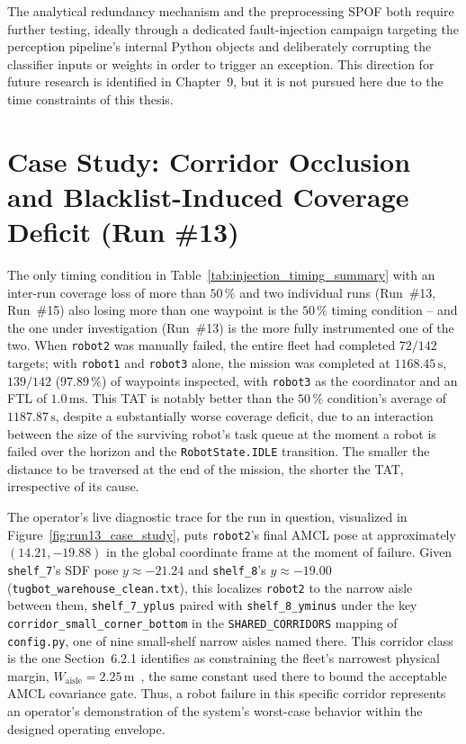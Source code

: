 The analytical redundancy mechanism and the preprocessing SPOF both require further testing, ideally through a dedicated fault-injection campaign targeting the perception pipeline's internal Python objects and deliberately corrupting the classifier inputs or weights in order to trigger an exception. This direction for future research is identified in Chapter~9, but it is not pursued here due to the time constraints of this thesis.

\section{Case Study: Corridor Occlusion and Blacklist-Induced Coverage Deficit (Run \#13)}

The only timing condition in Table~\ref{tab:injection_timing_summary} with an inter-run coverage loss of more than $50\,\%$ and two individual runs (Run~\#13, Run~\#15) also losing more than one waypoint is the $50\,\%$ timing condition -- and the one under investigation (Run~\#13) is the more fully instrumented one of the two. When \texttt{robot2} was manually failed, the entire fleet had completed $72/142$ targets; with \texttt{robot1} and \texttt{robot3} alone, the mission was completed at $1168.45\,\text{s}$, $139/142$ ($97.89\,\%$) of waypoints inspected, with \texttt{robot3} as the coordinator and an FTL of $1.0\,\text{ms}$. This TAT is notably better than the $50\,\%$ condition's average of $1187.87\,\text{s}$, despite a substantially worse coverage deficit, due to an interaction between the size of the surviving robot's task queue at the moment a robot is failed over the horizon and the \texttt{RobotState.IDLE} transition. The smaller the distance to be traversed at the end of the mission, the shorter the TAT, irrespective of its cause.

The operator's live diagnostic trace for the run in question, visualized in Figure~\ref{fig:run13_case_study}, puts \texttt{robot2}'s final AMCL pose at approximately $(14.21, -19.88)$ in the global coordinate frame at the moment of failure.  Given \texttt{shelf\_7}'s SDF pose $y \approx -21.24$ and \texttt{shelf\_8}'s $y \approx -19.00$ (\texttt{tugbot\_warehouse\_clean.txt}), this localizes \texttt{robot2} to the narrow aisle between them, \texttt{shelf\_7\_yplus} paired with \texttt{shelf\_8\_yminus} under the key \texttt{corridor\_small\_corner\_bottom} in the \texttt{SHARED\_CORRIDORS} mapping of \texttt{config.py}, one of nine small-shelf narrow aisles named there. This corridor class is the one Section~6.2.1 identifies as constraining the fleet's narrowest physical margin, $W_{\text{aisle}} = 2.25\,\text{m}$~\cite{silva2024agvs}, the same constant used there to bound the acceptable AMCL covariance gate. Thus, a robot failure in this specific corridor represents an operator's demonstration of the system's worst-case behavior within the designed operating envelope.

